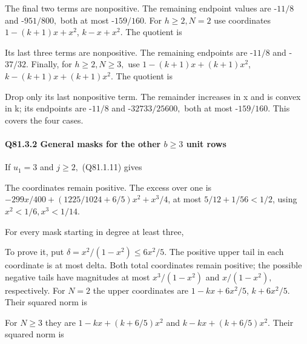 The final two terms are nonpositive. The remaining endpoint values
are -\(11/8\) and -\(951/800,\allowbreak \) both at most -\(159/160.\)
For \(h\ge 2,\allowbreak  N=2\) use coordinates
\(1-(k+1)x+x^2\), \(k-x+x^2\). The quotient is


Its last three terms are nonpositive. The remaining endpoints are
-\(11/8\) and -\(37/32.\) Finally, for \(h\ge 2,\allowbreak  N\ge 3,\allowbreak \) use
\(1-(k+1)x+(k+1)x^2\), \(k-(k+1)x+(k+1)x^2\). The quotient is


Drop only its last nonpositive term. The remainder increases in x
and is convex in k; its endpoints are -\(11/8\) and -\(32733/25600,\allowbreak \)
both at most -\(159/160.\) This covers the four cases.

\paragraph{Q81.3.2 General masks for the other \(b\ge 3\) unit rows}\label{part:Q81.3.2}

If \(u_{1}=3\) and \(j\ge 2,\allowbreak \) (Q81.1.11) gives


The coordinates remain positive. The excess over one is
\(-299x/400+(1225/1024+6/5)x^2+x^3/4\), at most
\(5/12+1/56<1/2\), using \(x^2<1/6,\allowbreak  x^3<1/14.\)

For every mask starting in degree at least three,


To prove it, put \(\delta=x^2/(1-x^2)\le 6x^2/5.\) The positive upper tail
in each coordinate is at most delta. Both total coordinates remain
positive; the possible negative tails have magnitudes at most
\(x^3/(1-x^2)\) and \(x/(1-x^2),\allowbreak \) respectively. For \(N=2\) the upper coordinates
are \(1-kx+6x^2/5\), \(k+6x^2/5\). Their squared norm is


For \(N\ge 3\) they are \(1-kx+(k+6/5)x^2\) and
\(k-kx+(k+6/5)x^2\). Their squared norm is


